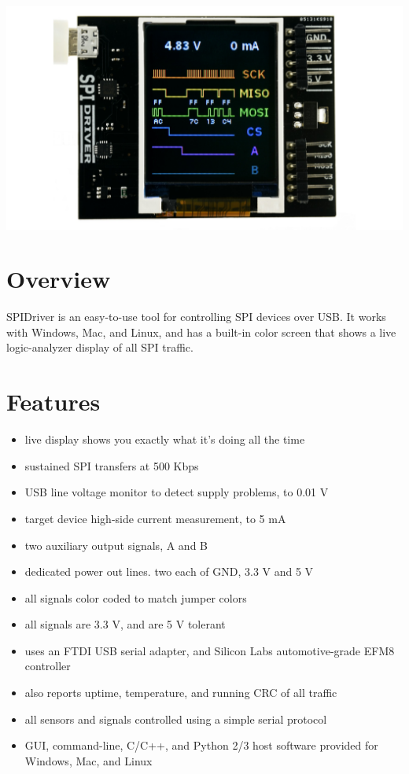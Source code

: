 \documentclass{article}
\begin{document}
\newpage
\begin{center}
\includegraphics[width=1.00\textwidth]{img/spidriver/main}
\end{center}
\tableofcontents

\newpage

\setlength{\parindent}{0mm}
\setlength{\parskip}{1mm}

\section{Overview}

SPIDriver is an easy-to-use tool for controlling SPI devices over USB.
It works with Windows, Mac, and Linux, and has a built-in color screen that shows a live logic-analyzer display of all SPI traffic.

\section{Features}
\begin{itemize}
\item live display shows you exactly what it’s doing all the time
\item sustained SPI transfers at 500 Kbps
\item USB line voltage monitor to detect supply problems, to 0.01 V
\item target device high-side current measurement, to 5 mA
\item two auxiliary output signals, A and B
\item dedicated power out lines. two each of GND, 3.3 V and 5 V
\item all signals color coded to match jumper colors
\item all signals are 3.3 V, and are 5 V tolerant
\item uses an FTDI USB serial adapter, and Silicon Labs automotive-grade EFM8 controller
\item also reports uptime, temperature, and running CRC of all traffic
\item all sensors and signals controlled using a simple serial protocol
\item GUI, command-line, C/C++, and Python 2/3 host software provided for Windows, Mac, and Linux
\end{itemize}
\end{document}
